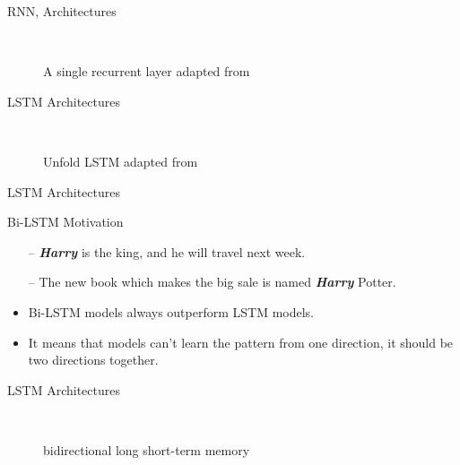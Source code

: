 \begin{frame}[fragile]{RNN, Architectures}
\begin{figure}[t]

\endminipage\hfill
{}

\endminipage\hfill
{}%

\endminipage
\caption{A single recurrent layer adapted from~\cite{colah}}~\label{Fig:LSTM_SimpleRNN}
\end{figure}%
\end{frame}


\begin{frame}[fragile]{LSTM Architectures}
\begin{figure}[t]

\endminipage\hfill
{}

\endminipage\hfill
{}%

\endminipage
\caption{Unfold LSTM adapted from~\cite{colah}}
~\label{Fig:LSTM_Cell_Chaining}
\end{figure}%
\end{frame}


\begin{frame}[fragile]{LSTM Architectures}
\begin{block}{Bi-LSTM Motivation}
\begin{itemize}
\item[--] \textit{\textbf{Harry}} is the king, and he will travel next week.
\item[--] The new book which makes the big sale is named \textit{\textbf{Harry}} Potter.
\end{itemize}
\end{block}

\begin{itemize}
\item Bi-LSTM models always outperform LSTM models.
\item It means that models can't learn the pattern from one direction, it
should be two directions together.
\end{itemize}
\end{frame}

\begin{frame}[fragile]{LSTM Architectures}
\begin{center}
\begin{figure}[!t]
\centering

\caption{bidirectional long short-term memory~\cite{Gitrepo_NN_Tikz}}~\label{Fig:BI-LSTM}
\end{figure}
\end{center}
\end{frame}

